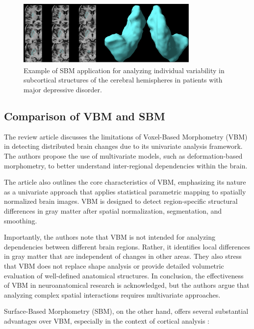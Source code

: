 \documentclass[default]{subfiles}
\begin{document}
\begin{figure}[H]
    \centering
    \includegraphics[width=0.8\textwidth]{image/pic1.png}
    \caption{
      Example of SBM application for analyzing individual variability in subcortical structures of the cerebral
      hemispheres in patients with major depressive disorder.
    }
\end{figure}

\subsection{Comparison of VBM and SBM}

The review article \cite{friston_2004} discusses the limitations of Voxel-Based Morphometry (VBM) in detecting
distributed brain changes due to its univariate analysis framework. The authors propose the use of multivariate models,
such as deformation-based morphometry, to better understand inter-regional dependencies within the brain.

The article also outlines the core characteristics of VBM, emphasizing its nature as a univariate approach that applies
statistical parametric mapping to spatially normalized brain images. VBM is designed to detect region-specific
structural differences in gray matter after spatial normalization, segmentation, and smoothing.

Importantly, the authors note that VBM is not intended for analyzing dependencies between different brain regions.
Rather, it identifies local differences in gray matter that are independent of changes in other areas. They also stress
that VBM does not replace shape analysis or provide detailed volumetric evaluation of well-defined anatomical
structures. In conclusion, the effectiveness of VBM in neuroanatomical research is acknowledged, but the authors argue
that analyzing complex spatial interactions requires multivariate approaches.

Surface-Based Morphometry (SBM), on the other hand, offers several substantial advantages over VBM, especially in the
context of cortical analysis \cite{evans_2015, friston_2004}:\newline
\end{document}
